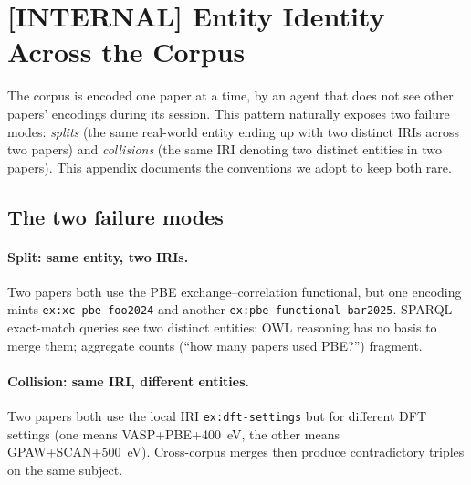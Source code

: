 \section{[INTERNAL] Entity Identity Across the Corpus}
\label{sec:appendix-internal-entity-iris}

\begin{center}
\end{center}

\bigskip

The corpus is encoded one paper at a time, by an agent that does
not see other papers' encodings during its session. This pattern
naturally exposes two failure modes: \emph{splits} (the same
real-world entity ending up with two distinct IRIs across two
papers) and \emph{collisions} (the same IRI denoting two distinct
entities in two papers). This appendix documents the conventions
we adopt to keep both rare.

\subsection{The two failure modes}

\paragraph{Split: same entity, two IRIs.}
Two papers both use the PBE exchange--correlation functional, but
one encoding mints \texttt{ex:xc-pbe-foo2024} and another
\texttt{ex:pbe-functional-bar2025}. SPARQL exact-match queries see
two distinct entities; OWL reasoning has no basis to merge them;
aggregate counts (``how many papers used PBE?'') fragment.

\paragraph{Collision: same IRI, different entities.}
Two papers both use the local IRI \texttt{ex:dft-settings} but for
different DFT settings (one means VASP+PBE+400~eV, the other means
GPAW+SCAN+500~eV). Cross-corpus merges then produce contradictory
triples on the same subject.

